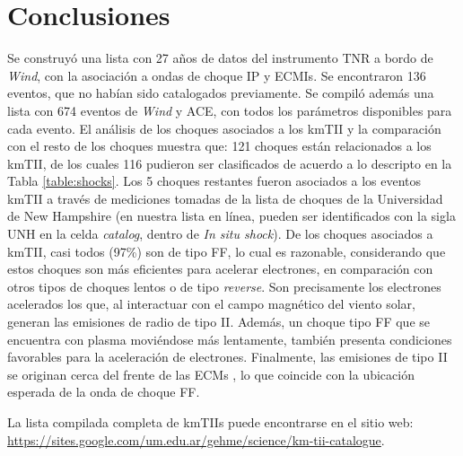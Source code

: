 \documentclass[baaa]{baaa}
\begin{document}
\section{Conclusiones}\label{ref}

Se construyó una lista con 27 años de datos del instrumento TNR a bordo de \textit{Wind}, con la asociación a ondas de choque IP y ECMIs. Se encontraron 136 eventos, que no habían sido catalogados previamente. Se compiló además una lista con 674 eventos de \textit{Wind} y ACE, con todos los parámetros disponibles para cada evento. El análisis de los choques asociados a los kmTII y la comparación con el resto de los choques muestra que: 121 choques están relacionados a los kmTII, de los cuales 116 pudieron ser clasificados de acuerdo a lo descripto en la Tabla \ref{table:shocks}. Los 5 choques restantes fueron asociados a los eventos kmTII a través de mediciones tomadas de la lista de choques de la Universidad de New Hampshire (en nuestra lista en línea, pueden ser identificados con la sigla UNH en la celda \emph{catalog}, dentro de \emph{In situ shock}). De los choques asociados a kmTII, casi todos (97\%) son de tipo FF, lo cual es razonable, considerando que estos choques son más eficientes para acelerar electrones, en comparación con otros tipos de choques lentos o de tipo \textit{reverse}. Son precisamente los electrones acelerados los que, al interactuar con el campo magnético del viento solar, generan las emisiones de radio de tipo II. Además, un choque tipo FF que se encuentra con plasma moviéndose más lentamente, también presenta condiciones favorables para la aceleración de electrones. Finalmente, las emisiones de tipo II se originan cerca del frente de las ECMs \citep{makela16}, lo que coincide con la ubicación esperada de la onda de choque FF.

La lista compilada completa de kmTIIs puede encontrarse en el sitio web: \url{https://sites.google.com/um.edu.ar/gehme/science/km-tii-catalogue}.


\end{document}
